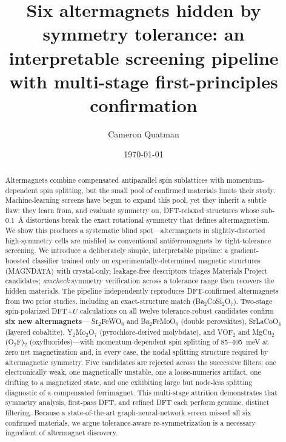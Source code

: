 \documentclass[aps,prmaterials,twocolumn,superscriptaddress,showkeys]{revtex4-2}
\begin{document}
\title{Six altermagnets hidden by symmetry tolerance: an interpretable screening
pipeline with multi-stage first-principles confirmation}

\author{Cameron Quatman}

\date{\today}

\begin{abstract}
Altermagnets combine compensated antiparallel spin sublattices with
momentum-dependent spin splitting, but the small pool of confirmed materials
limits their study. Machine-learning screens have begun to expand this pool, yet
they inherit a subtle flaw: they learn from, and evaluate symmetry on,
DFT-relaxed structures whose sub-0.1~\AA{} distortions break the exact
rotational symmetry that defines altermagnetism. We show this produces a
systematic blind spot---altermagnets in slightly-distorted high-symmetry cells
are misfiled as conventional antiferromagnets by tight-tolerance screening. We
introduce a deliberately simple, interpretable pipeline: a gradient-boosted
classifier trained only on experimentally-determined magnetic structures
(MAGNDATA) with crystal-only, leakage-free descriptors triages Materials
Project candidates; \textit{amcheck} symmetry verification across a tolerance
range then recovers the hidden materials. The pipeline independently reproduces
DFT-confirmed altermagnets from two prior studies, including an exact-structure
match (Ba$_2$CoSi$_2$O$_7$). Two-stage spin-polarized DFT+$U$ calculations on
all twelve tolerance-robust candidates confirm \textbf{six new altermagnets}---
Sr$_2$FeWO$_6$ and Ba$_2$FeMoO$_6$ (double perovskites), SrLaCoO$_4$ (layered
cobaltite), Y$_2$Mo$_2$O$_7$ (pyrochlore-derived molybdate), and VOF$_2$ and
MgCu$_2$(O$_2$F)$_2$ (oxyfluorides)---with momentum-dependent spin splitting of
85--405~meV at zero net magnetization and, in every case, the nodal splitting
structure required by altermagnetic symmetry. Five candidates are rejected
across the successive filters: one electronically weak, one magnetically
unstable, one a loose-numerics artifact, one drifting to a magnetized state,
and one exhibiting large but node-less splitting diagnostic of a compensated
ferrimagnet. This multi-stage attrition demonstrates that symmetry analysis,
first-pass DFT, and refined DFT each perform genuine, distinct filtering.
Because a state-of-the-art graph-neural-network screen missed all six confirmed
materials, we argue tolerance-aware re-symmetrization is a necessary ingredient
of altermagnet discovery.
\end{abstract}
\end{document}
